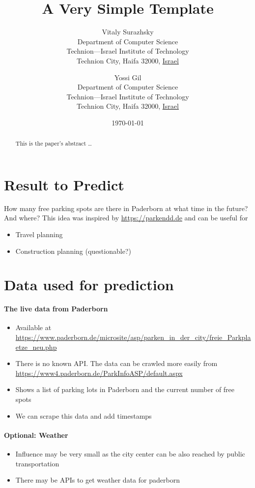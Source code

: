 \documentclass[journal,10pt]{IEEEtran}
\title{A Very Simple \LaTeXe{} Template}
\author{
        Vitaly Surazhsky \\
                Department of Computer Science\\
        Technion---Israel Institute of Technology\\
        Technion City, Haifa 32000, \underline{Israel}
            \and
        Yossi Gil\\
        Department of Computer Science\\
        Technion---Israel Institute of Technology\\
        Technion City, Haifa 32000, \underline{Israel}
}
\date{\today}
\begin{document}
\maketitle

\begin{abstract}
This is the paper's abstract \ldots
\end{abstract}

\section{Result to Predict} How many free parking spots are there in Paderborn at what time in the future? And where? This idea was inspired by \url{https://parkendd.de} and can be useful for 

\begin{itemize}
  \item Travel planning
  \item Construction planning (questionable?)
\end{itemize}

\section{Data used for prediction}\label{data sources}
\paragraph{The live data from Paderborn}

\begin{itemize}
  \item Available at \url{https://www.paderborn.de/microsite/asp/parken_in_der_city/freie_Parkplaetze_neu.php}
  \item There is no known API. The data can be crawled more easily from \url{https://www4.paderborn.de/ParkInfoASP/default.aspx}
  \item Shows a list of parking lots in Paderborn and the current number of free spots
  \item We can scrape this data and add timestamps
\end{itemize}

\paragraph{Optional: Weather}
\begin{itemize}
  \item Influence may be very small as the city center can be also reached by public transportation
  \item There may be APIs to get weather data for paderborn
\end{itemize}
\end{document}
